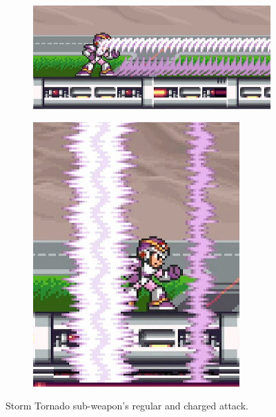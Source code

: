 \begin{figure}[htp]
	\centering
	\begin{subfigure}{0.35\linewidth}
		\includegraphics[width=\linewidth]{figures/X1/weapons/Storm_tornado_1.jpg}
	\end{subfigure}
	\begin{subfigure}{0.25\linewidth}
		\includegraphics[width=\linewidth]{figures/X1/weapons/Storm_tornado_2.jpg}
	\end{subfigure}
	\caption{Storm Tornado sub-weapon's regular and charged attack.}
\end{figure}

